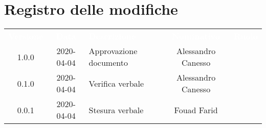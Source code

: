 \section*{Registro delle modifiche}
{
	\centering
	\begin{longtable}{ c c  C{4cm}  c  c }
		\textcolor{white}{\textbf{Versione}} & \textcolor{white}{\textbf{Data}} & \textcolor{white}{\textbf{Descrizione}} & \textcolor{white}{\textbf{Nominativo}} & \textcolor{white}{\textbf{Ruolo}}\\		
		1.0.0 & 2020-04-04 & Approvazione documento & Alessandro Canesso & \RdP{}\\
		0.1.0 & 2020-04-04 & Verifica verbale & Alessandro Canesso & \ver{} \\
		0.0.1 & 2020-04-04 & Stesura verbale & Fouad Farid &\reda{}\\		
		
	\end{longtable}

}